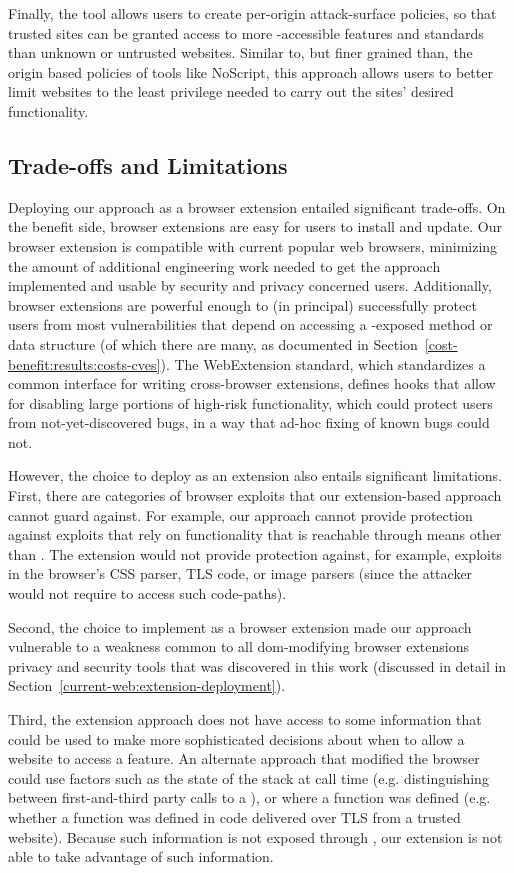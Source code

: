 Finally, the tool allows users to create per-origin attack-surface policies,
so that trusted sites can be granted access to more \JS-accessible
features and standards than unknown or untrusted websites.  Similar to, but
finer grained than, the origin based policies of tools like NoScript, this
approach allows users to better limit websites to the least privilege
needed to carry out the sites' desired functionality.


\subsection{Trade-offs and Limitations}
Deploying our approach as a browser extension entailed significant trade-offs.
On the benefit side, browser extensions are easy for users to install and update.
Our browser extension is compatible with current popular web browsers,
minimizing the amount of additional engineering work needed to get the approach
implemented and usable by security and privacy concerned users.  Additionally,
browser extensions are powerful enough to (in principal) successfully protect
users from most vulnerabilities that depend on accessing a \JS-exposed method
or data structure (of which there are many, as documented in
Section~\ref{cost-benefit:results:costs-cves}).  The WebExtension standard, which
standardizes a common interface for writing cross-browser extensions,
defines hooks that allow for disabling large portions of high-risk
functionality, which could protect users from not-yet-discovered bugs, in a way
that ad-hoc fixing of known bugs could not.

However, the choice to deploy as an extension also entails significant
limitations.  First, there are categories of browser exploits
that our extension-based approach cannot guard against.  For example, our
approach cannot provide protection against exploits that rely on \WAPI
functionality that is reachable through means other than \JS.
The extension would not provide protection against, for example,
exploits in the browser's CSS parser, TLS code, or image parsers (since the
attacker would not require \JS to access such code-paths).

Second, the choice to implement as a browser extension made our approach
vulnerable to a weakness common to all \gls{dom}-modifying browser extensions
privacy and security tools that was discovered in this work (discussed in
detail in Section~\ref{current-web:extension-deployment}).

Third, the extension approach does not have access to some
information that could be used to make more sophisticated decisions about
when to allow a website to access a feature.  An alternate approach that
modified the browser could use factors such as the state of the stack at call
time (e.g. distinguishing between first-and-third party calls to a \WAS), or
where a function was defined (e.g. whether a function was defined in \JS code
delivered over TLS from a trusted website).  Because such information is not
exposed through \JS, our extension is not able to take advantage of
such information.


